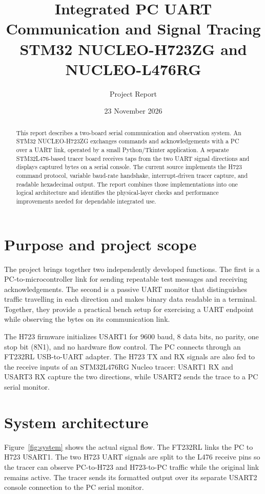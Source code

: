 \documentclass[10pt,a4paper]{article}
\title{Integrated PC UART Communication and Signal Tracing\\\large STM32 NUCLEO-H723ZG and NUCLEO-L476RG}
\author{Project Report}
\date{23 November 2026}
\begin{document}
\maketitle

\begin{abstract}
This report describes a two-board serial communication and observation system. An STM32 NUCLEO-H723ZG exchanges commands and acknowledgements with a PC over a UART link, operated by a small Python/Tkinter application. A separate STM32L476-based tracer board receives taps from the two UART signal directions and displays captured bytes on a serial console. The current source implements the H723 command protocol, variable baud-rate handshake, interrupt-driven tracer capture, and readable hexadecimal output. The report combines those implementations into one logical architecture and identifies the physical-layer checks and performance improvements needed for dependable integrated use.
\end{abstract}

\section{Purpose and project scope}
The project brings together two independently developed functions. The first is a PC-to-microcontroller link for sending repeatable test messages and receiving acknowledgements. The second is a passive UART monitor that distinguishes traffic travelling in each direction and makes binary data readable in a terminal. Together, they provide a practical bench setup for exercising a UART endpoint while observing the bytes on its communication link.

The H723 firmware initializes USART1 for 9600 baud, 8 data bits, no parity, one stop bit (8N1), and no hardware flow control. The PC connects through an FT232RL USB-to-UART adapter. The H723 TX and RX signals are also fed to the receive inputs of an STM32L476RG Nucleo tracer: USART1 RX and USART3 RX capture the two directions, while USART2 sends the trace to a PC serial monitor.

\section{System architecture}
Figure~\ref{fig:system} shows the actual signal flow. The FT232RL links the PC to H723 USART1. The two H723 UART signals are split to the L476 receive pins so the tracer can observe PC-to-H723 and H723-to-PC traffic while the original link remains active. The tracer sends its formatted output over its separate USART2 console connection to the PC serial monitor.
\end{document}
